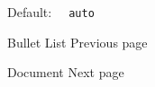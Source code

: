 Default: \texttt{\ }{\texttt{\ auto\ }}\texttt{\ }

\href{/docs/reference/model/list/}{\pandocbounded{}}

{ Bullet List } { Previous page }

\href{/docs/reference/model/document/}{\pandocbounded{}}

{ Document } { Next page }
